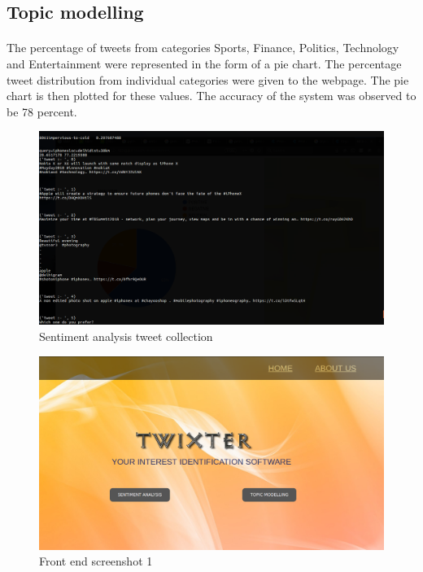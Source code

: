 \subsection{Topic modelling}
\paragraph{} The percentage of tweets from categories Sports, Finance, Politics, Technology and Entertainment were represented in the form of a pie chart. The percentage tweet distribution from individual categories were given to the webpage. The pie chart is then plotted for these values. The accuracy of the system was observed to be 78 percent.

\begin{figure}[!ht]
	\centering
	\includegraphics[width=0.9\linewidth]{sentiment_server.png}
	\caption{Sentiment analysis tweet collection}
	\label{fig:expression01}
\end{figure}


\begin{figure}[h]
	\centering
	\includegraphics[width=0.9\linewidth]{image1.png}
	\caption{Front end screenshot 1}
	\label{fig:expression01}
\end{figure}


